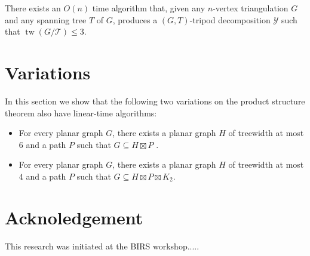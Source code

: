 \documentclass{patmorin}
\DeclareMathOperator{\tw}{tw}
\begin{document}
\begin{thm}
  There exists an $O(n)$ time algorithm that, given any $n$-vertex triangulation $G$ and any spanning tree $T$ of $G$, produces a $(G,T)$-tripod decomposition $\mathcal{Y}$ such that $\tw(G/\mathcal{T})\le 3$.
\end{thm}


\section{Variations}

In this section we show that the following two variations on the product structure theorem also have linear-time algorithms:
\begin{itemize}
  \item For every planar graph $G$, there exists a planar graph $H$ of  treewidth at most $6$ and a path $P$ such that $G\subseteq H\boxtimes P$ \cite{ueckerdt.wood.ea:XX}.
  \item For every planar graph $G$, there exists a planar graph $H$ of treewidth at most $4$ and a path $P$ such that $G\subseteq H\boxtimes P\boxtimes K_2$.
\end{itemize}


\section*{Acknoledgement}

This research was initiated at the BIRS workshop.....
\end{document}
